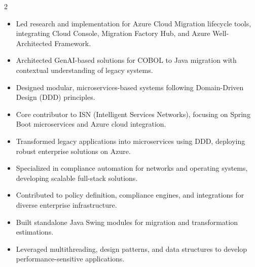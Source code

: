 \documentclass[10pt,a4paper,ragged2e,withhyper]{altacv}
\begin{document}
\makecvheader

\begin{paracol}{2}

\begin{itemize}
\item Led research and implementation for Azure Cloud Migration lifecycle tools, integrating Cloud Console, Migration Factory Hub, and Azure Well-Architected Framework.
\item Architected GenAI-based solutions for COBOL to Java migration with contextual understanding of legacy systems.
\item Designed modular, microservices-based systems following Domain-Driven Design (DDD) principles.
\end{itemize}
\divider

\begin{itemize}
\item Core contributor to ISN (Intelligent Services Networks), focusing on Spring Boot microservices and Azure cloud integration.
\item Transformed legacy applications into microservices using DDD, deploying robust enterprise solutions on Azure.
\end{itemize}
\divider

\begin{itemize}
\item Specialized in compliance automation for networks and operating systems, developing scalable full-stack solutions.
\item Contributed to policy definition, compliance engines, and integrations for diverse enterprise infrastructure.
\end{itemize}
\divider

\begin{itemize}
\item Built standalone Java Swing modules for migration and transformation estimations.
\item Leveraged multithreading, design patterns, and data structures to develop performance-sensitive applications.
\end{itemize}


\end{paracol}
\end{document}
